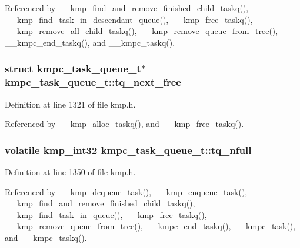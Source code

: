 Referenced by \-\_\-\-\_\-kmp\-\_\-find\-\_\-and\-\_\-remove\-\_\-finished\-\_\-child\-\_\-taskq(), \-\_\-\-\_\-kmp\-\_\-find\-\_\-task\-\_\-in\-\_\-descendant\-\_\-queue(), \-\_\-\-\_\-kmp\-\_\-free\-\_\-taskq(), \-\_\-\-\_\-kmp\-\_\-remove\-\_\-all\-\_\-child\-\_\-taskq(), \-\_\-\-\_\-kmp\-\_\-remove\-\_\-queue\-\_\-from\-\_\-tree(), \-\_\-\-\_\-kmpc\-\_\-end\-\_\-taskq(), and \-\_\-\-\_\-kmpc\-\_\-taskq().

\hypertarget{structkmpc__task__queue__t_a1ed21643e12300700496257e9d543351}{
\subsubsection[{tq\-\_\-next\-\_\-free}]{\setlength{\rightskip}{0pt plus 5cm}struct {\bf kmpc\-\_\-task\-\_\-queue\-\_\-t}$\ast$ kmpc\-\_\-task\-\_\-queue\-\_\-t\-::tq\-\_\-next\-\_\-free}}\label{structkmpc__task__queue__t_a1ed21643e12300700496257e9d543351}


Definition at line 1321 of file kmp.\-h.



Referenced by \-\_\-\-\_\-kmp\-\_\-alloc\-\_\-taskq(), and \-\_\-\-\_\-kmp\-\_\-free\-\_\-taskq().

\hypertarget{structkmpc__task__queue__t_a44546f52b8cb3b1ab9f0819b3a2aacff}{
\subsubsection[{tq\-\_\-nfull}]{\setlength{\rightskip}{0pt plus 5cm}volatile kmp\-\_\-int32 kmpc\-\_\-task\-\_\-queue\-\_\-t\-::tq\-\_\-nfull}}\label{structkmpc__task__queue__t_a44546f52b8cb3b1ab9f0819b3a2aacff}


Definition at line 1350 of file kmp.\-h.



Referenced by \-\_\-\-\_\-kmp\-\_\-dequeue\-\_\-task(), \-\_\-\-\_\-kmp\-\_\-enqueue\-\_\-task(), \-\_\-\-\_\-kmp\-\_\-find\-\_\-and\-\_\-remove\-\_\-finished\-\_\-child\-\_\-taskq(), \-\_\-\-\_\-kmp\-\_\-find\-\_\-task\-\_\-in\-\_\-queue(), \-\_\-\-\_\-kmp\-\_\-free\-\_\-taskq(), \-\_\-\-\_\-kmp\-\_\-remove\-\_\-queue\-\_\-from\-\_\-tree(), \-\_\-\-\_\-kmpc\-\_\-end\-\_\-taskq(), \-\_\-\-\_\-kmpc\-\_\-task(), and \-\_\-\-\_\-kmpc\-\_\-taskq().


